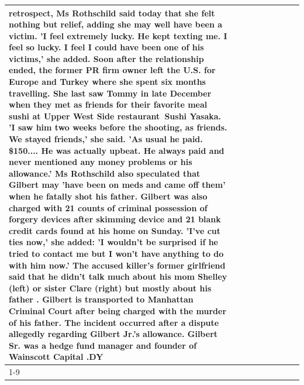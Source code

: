 \begin{table}[H]
\begin{tabular}{lllrlllll}
retrospect, Ms Rothschild said today that she felt nothing but relief, adding she may well have been a victim. 'I feel extremely lucky. He kept texting me. I feel so lucky. I feel I could have been one of his victims,' she added. Soon after the relationship ended, the former PR firm owner left the U.S. for Europe and Turkey where she spent six months  travelling. She last saw Tommy in late December when they met as friends for their favorite meal sushi at Upper West Side restaurant Sushi Yasaka. 'I saw him two weeks before the shooting, as friends. We stayed friends,' she said. 'As usual he paid. \$150.... He was actually upbeat. He always paid and never mentioned any money problems or his allowance.' Ms Rothschild also speculated that Gilbert may 'have been on meds and came off them' when he fatally shot his father. Gilbert was also charged with 21 counts of criminal possession of forgery devices after skimming device and 21 blank credit cards found at his home on Sunday. 'I've cut ties now,' she added: 'I wouldn’t be surprised if he tried to contact me but I won’t have anything to do with him now.' The accused killer's former girlfriend said that he didn't talk much about his mom Shelley (left) or sister Clare (right) but mostly about his father . Gilbert is transported to Manhattan Criminal Court  after being charged with the murder of his father. The incident occurred after a dispute allegedly regarding Gilbert Jr.'s allowance. Gilbert Sr. was a hedge fund manager and founder of Wainscott Capital .DY \\
\cline{1-9}

\end{tabular}
\end{table}
